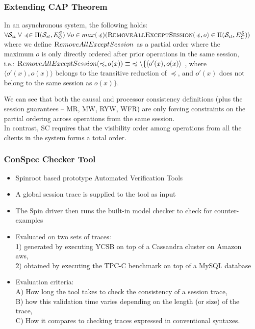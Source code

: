 \documentclass{beamer}
\begin{document}
\begin{frame}
\frametitle{Extending CAP Theorem}
\begin{theorem}\label{thrm:capan}
	In an asynchronous system, 
	 the following holds:
	$\forall \mathcal{S}_{it} \; \forall \preccurlyeq \in \Pi(\mathcal{S}_{it},E^S_C) \; \forall o \in max(\preccurlyeq) (\textsc{RemoveAllExceptSession}(\preccurlyeq,o) \in \Pi(\mathcal{S}_{it},E^S_C) ) $
	where we define {$\textsc RemoveAllExceptSession$} as a partial order where the maximum $o$ is only directly ordered after prior operations in the same session, i.e.:
	$\noindent {\textsc RemoveAllExceptSession}(\preccurlyeq,o(x)) \equiv \; \preccurlyeq \setminus \{ \langle o'(x),o(x) \rangle$ , where $\langle o'(x),o(x) \rangle$ belongs to the transitive reduction of $\preccurlyeq$, and $o'(x)$ does not belong to the same session as $o(x)\}$.
\end{theorem}
We can see that both the causal and processor consistency definitions (plus the session guarantees – MR, MW, RYW, WFR) are only forcing constraints on the partial ordering across operations from the same session.\\
In contrast, SC requires that the visibility order  among operations from all the clients in the system forms a total order.
\end{frame}

\begin{frame}
\frametitle{ConSpec Checker Tool}
\begin{itemize}
	\item Spinroot based prototype Automated Verification Tools
 \item A global session trace is supplied to the tool as input
\item The Spin driver then runs the built-in model checker to check for counter-examples
\item Evaluated on two sets of traces: \\
1) generated by executing YCSB on top of a Cassandra cluster on Amazon aws,  \\
2)  obtained by executing the TPC-C benchmark on top of a MySQL database
\item Evaluation criteria: \\
A) How long the tool takes to check the consistency of a session trace, \\
B) how this validation time varies depending on the length (or size) of the trace, \\
C) How it compares to checking traces expressed in conventional syntaxes.
\end{itemize}
	
\end{frame}
\end{document}
